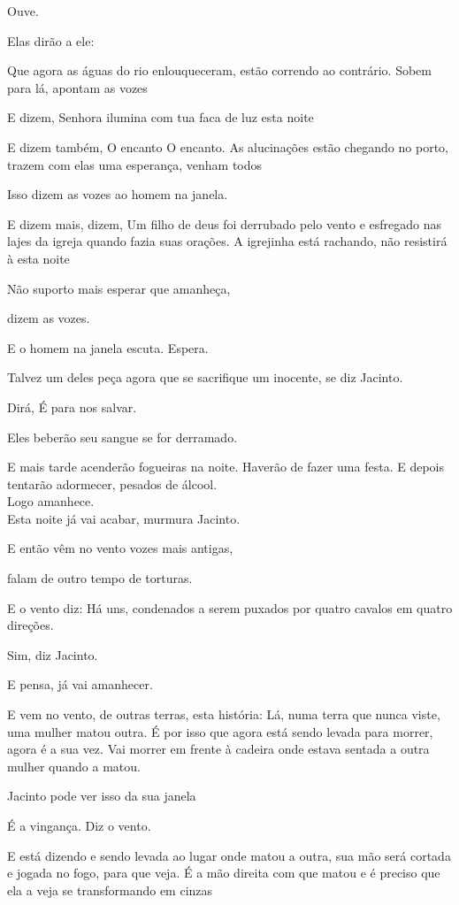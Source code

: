 Ouve.

Elas dirão a ele:

Que agora as águas do rio enlouqueceram, estão correndo ao contrário.
Sobem para lá, apontam as vozes

E dizem, Senhora ilumina com tua faca de luz esta noite

E dizem também, O encanto O encanto. As alucinações estão chegando no
porto, trazem com elas uma esperança, venham todos

Isso dizem as vozes ao homem na janela.

E dizem mais, dizem, Um filho de deus foi derrubado pelo vento e
esfregado nas lajes da igreja quando fazia suas orações. A igrejinha
está rachando, não resistirá à esta noite

Não suporto mais esperar que amanheça,

dizem as vozes.

E o homem na janela escuta. Espera.

Talvez um deles peça agora que se sacrifique um inocente, se diz
Jacinto.

Dirá, É para nos salvar.

Eles beberão seu sangue se for derramado.

E mais tarde acenderão fogueiras na noite. Haverão de fazer uma festa. E
depois tentarão adormecer, pesados de álcool.\\

Logo amanhece.\\

Esta noite já vai acabar, murmura Jacinto.

E então vêm no vento vozes mais antigas,

falam de outro tempo de torturas.

E o vento diz: Há uns, condenados a serem puxados por quatro cavalos em
quatro direções.

Sim, diz Jacinto.

E pensa, já vai amanhecer.

E vem no vento, de outras terras, esta história: Lá, numa terra que
nunca viste, uma mulher matou outra. É por isso que agora está sendo
levada para morrer, agora é a sua vez. Vai morrer em frente à cadeira
onde estava sentada a outra mulher quando a matou.

Jacinto pode ver isso da sua janela

É a vingança. Diz o vento.

E está dizendo e sendo levada ao lugar onde matou a outra, sua mão será
cortada e jogada no fogo, para que veja. É a mão direita com que matou e
é preciso que ela a veja se transformando em cinzas

